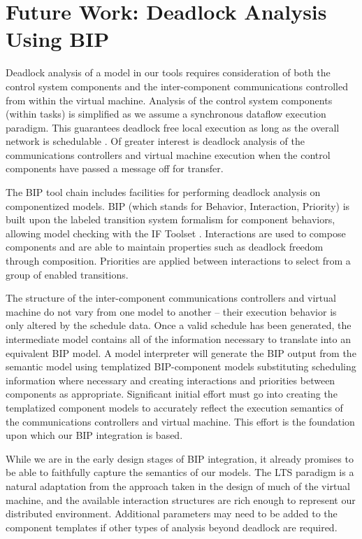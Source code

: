 \section{Future Work: Deadlock Analysis Using BIP}

Deadlock analysis of a model in our tools requires consideration of both the control system 
components and the inter-component communications controlled from within the virtual machine.  
Analysis of the control system components (within tasks) is simplified as we assume a 
synchronous dataflow execution paradigm. This guarantees deadlock free local execution as 
long as the overall network is schedulable \cite{moc:sdf}.  Of greater interest is deadlock 
analysis of the communications controllers and virtual machine execution when the control 
components have passed a message off for transfer.

The BIP \cite{verif:basu} \cite{verif:BIPFramework} tool chain includes
facilities for performing 
deadlock analysis on componentized models.  BIP (which stands for Behavior, Interaction, 
Priority) is built upon the labeled transition system formalism for component behaviors, 
allowing model checking with the IF Toolset  \cite{verif:IFToolset}. Interactions are used 
to compose components and are able to maintain properties such as deadlock freedom through 
composition.  Priorities are applied between interactions to select from a group of enabled 
transitions.

The structure of the inter-component communications controllers and virtual machine do not 
vary from one model to another -- their execution behavior is only altered by the schedule 
data.  Once a valid schedule has been generated, the intermediate model contains all of the 
information necessary to translate into an equivalent BIP model.  A model interpreter will 
generate the BIP output from the semantic model using templatized BIP-component models 
substituting scheduling information where necessary and creating interactions and priorities 
between components as appropriate. Significant initial effort must go into creating the 
templatized component models to accurately reflect the execution semantics of the communications 
controllers and virtual machine.  This effort is the foundation upon which our BIP integration 
is based.

While we are in the early design stages of BIP integration, it already promises to be able to 
faithfully capture the semantics of our models.  The LTS paradigm is a natural adaptation from 
the approach taken in the design of much of the virtual machine, and the available interaction 
structures are rich enough to represent our distributed environment. Additional parameters may 
need to be added to the component templates if other types of analysis beyond deadlock are required.
